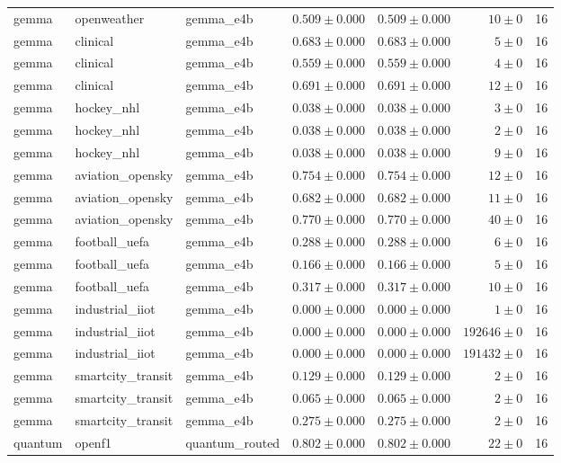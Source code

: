 \begin{table}[htbp]
\begin{tabular}{l l l r r r r}
gemma & openweather & gemma\_e4b & $0.509\pm0.000$ & $0.509\pm0.000$ & $10\pm0$ & 16 \\
gemma & clinical & gemma\_e4b & $0.683\pm0.000$ & $0.683\pm0.000$ & $5\pm0$ & 16 \\
gemma & clinical & gemma\_e4b & $0.559\pm0.000$ & $0.559\pm0.000$ & $4\pm0$ & 16 \\
gemma & clinical & gemma\_e4b & $0.691\pm0.000$ & $0.691\pm0.000$ & $12\pm0$ & 16 \\
gemma & hockey\_nhl & gemma\_e4b & $0.038\pm0.000$ & $0.038\pm0.000$ & $3\pm0$ & 16 \\
gemma & hockey\_nhl & gemma\_e4b & $0.038\pm0.000$ & $0.038\pm0.000$ & $2\pm0$ & 16 \\
gemma & hockey\_nhl & gemma\_e4b & $0.038\pm0.000$ & $0.038\pm0.000$ & $9\pm0$ & 16 \\
gemma & aviation\_opensky & gemma\_e4b & $0.754\pm0.000$ & $0.754\pm0.000$ & $12\pm0$ & 16 \\
gemma & aviation\_opensky & gemma\_e4b & $0.682\pm0.000$ & $0.682\pm0.000$ & $11\pm0$ & 16 \\
gemma & aviation\_opensky & gemma\_e4b & $0.770\pm0.000$ & $0.770\pm0.000$ & $40\pm0$ & 16 \\
gemma & football\_uefa & gemma\_e4b & $0.288\pm0.000$ & $0.288\pm0.000$ & $6\pm0$ & 16 \\
gemma & football\_uefa & gemma\_e4b & $0.166\pm0.000$ & $0.166\pm0.000$ & $5\pm0$ & 16 \\
gemma & football\_uefa & gemma\_e4b & $0.317\pm0.000$ & $0.317\pm0.000$ & $10\pm0$ & 16 \\
gemma & industrial\_iiot & gemma\_e4b & $0.000\pm0.000$ & $0.000\pm0.000$ & $1\pm0$ & 16 \\
gemma & industrial\_iiot & gemma\_e4b & $0.000\pm0.000$ & $0.000\pm0.000$ & $192646\pm0$ & 16 \\
gemma & industrial\_iiot & gemma\_e4b & $0.000\pm0.000$ & $0.000\pm0.000$ & $191432\pm0$ & 16 \\
gemma & smartcity\_transit & gemma\_e4b & $0.129\pm0.000$ & $0.129\pm0.000$ & $2\pm0$ & 16 \\
gemma & smartcity\_transit & gemma\_e4b & $0.065\pm0.000$ & $0.065\pm0.000$ & $2\pm0$ & 16 \\
gemma & smartcity\_transit & gemma\_e4b & $0.275\pm0.000$ & $0.275\pm0.000$ & $2\pm0$ & 16 \\
quantum & openf1 & quantum\_routed & $0.802\pm0.000$ & $0.802\pm0.000$ & $22\pm0$ & 16 \\

\end{tabular}
\end{table}
